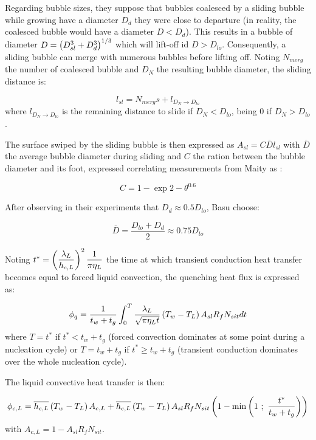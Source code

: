 Regarding bubble sizes, they suppose that bubbles coalesced by a sliding bubble while growing have a diameter $D_{d}$ \ie they were close to departure (in reality, the coalesced bubble would have a diameter $D<D_{d}$). This results in a bubble of diameter $D=\left( D_{sl}^{3} + D_{d}^{3} \right)^{1/3}$ which will lift-off id $D>D_{lo}$. Consequently, a sliding bubble can merge with numerous bubbles before lifting off. Noting $N_{merg}$ the number of coalesced bubble and $D_{N}$ the resulting bubble diameter, the sliding distance is:

\begin{equation}
l_{sl}=N_{merg}s + l_{D_{N}\rightarrow D_{lo}}
\end{equation}
where $l_{D_{N}\rightarrow D_{lo}}$ is the remaining distance to slide if $D_{N}<D_{lo}$, being $0$ if $D_{N}>D_{lo}$.

The surface swiped by the sliding bubble is then expressed as $A_{sl} = C\overline{D}l_{sl}$ with $\overline{D}$ the average bubble diameter during sliding and $C$ the ration between the bubble diameter and its foot, expressed correlating measurements from Maity \cite{Maity2000} as :

\begin{equation}
C=1-\exp{2-\theta ^{0.6}}
\end{equation}

After observing in their experiments that $D_{d}\approx 0.5D_{lo}$, Basu \etal choose:

\begin{equation}
\overline{D}=\frac{D_{lo}+D_{d}}{2}\approx 0.75D_{lo}
\end{equation}

Noting $t^{*}=\left( \dfrac{\lambda_{L}}{h_{c,L}} \right)^{2} \dfrac{1}{\pi \eta_{L}}$ the time at which transient conduction heat transfer becomes equal to forced liquid convection, the quenching heat flux is expressed as:

\begin{equation}
\phi_{q} = \frac{1}{t_{w}+t_{g}} \int_{0}^{T}\frac{\lambda_{L}}{\sqrt{\pi \eta_{L}t}}\left( T_{w}-T_{L} \right)A_{sl}R_{f}N_{sit}dt
\end{equation}
where $T=t^{*}$ if $t^{*}<t_{w}+t_{g}$ (forced convection dominates at some point during a nucleation cycle) or $T=t_{w}+t_{g}$ if $t^{*}\geq t_{w}+t_{g}$ (transient conduction dominates over the whole nucleation cycle).

\npar
The liquid convective heat transfer is then:

\begin{equation}
\phi_{c,L} = \overline{h_{c,L}}\parth{T_{w}-T_{L}}A_{c,L} + \overline{h_{c,L}}\parth{T_{w}-T_{L}}A_{sl}R_{f}N_{sit}\parth{1-\mathrm{min}\parth{1\ ;\ \frac{t^{*}}{t_{w}+t_{g}}}}
\label{eq:HFP_B_phiCL}
\end{equation}
with $A_{c,L} = 1 - A_{sl}R_{f}N_{sit}$.

